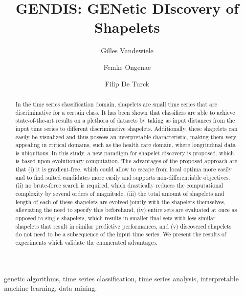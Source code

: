 \documentclass[runningheads]{llncs}
\begin{document}
\title{GENDIS: GENetic DIscovery of Shapelets}  

\author{Gilles Vandewiele \and Femke Ongenae \and Filip De Turck
}


\maketitle

\begin{abstract}

In the time series classification domain, shapelets are small time series that are discriminative for a certain class. It has been shown that classifiers are able to achieve state-of-the-art results on a plethora of datasets by taking as input distances from the input time series to different discriminative shapelets. Additionally, these shapelets can easily be visualized and thus possess an interpretable characteristic, making them very appealing in critical domains, such as the health care domain, where longitudinal data is ubiquitous. In this study, a new paradigm for shapelet discovery is proposed, which is based upon evolutionary computation. The advantages of the proposed approach are that (i) it is gradient-free, which could allow to escape from local optima more easily and to find suited candidates more easily and supports non-differentiable objectives, (ii) no brute-force search is required, which drastically reduces the computational complexity by several orders of magnitude, (iii) the total amount of shapelets and length of each of these shapelets are evolved jointly with the shapelets themselves, alleviating the need to specify this beforehand, (iv) entire sets are evaluated at once as opposed to single shapelets, which results in smaller final sets with less similar shapelets that result in similar predictive performances, and (v) discovered shapelets do not need to be a subsequence of the input time series. We present the results of experiments which validate the enumerated advantages.

\end{abstract}

\begin{keywords}

genetic algorithms, 
time series classification,
time series analysis,
interpretable machine learning,
data mining.

\end{keywords}
\end{document}
